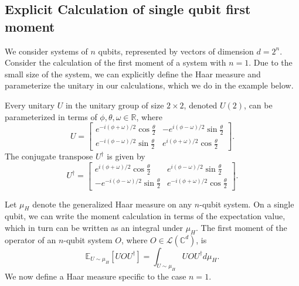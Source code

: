 \subsection{Explicit Calculation of single qubit first moment}
We consider systems of $n$ qubits, represented by vectors of dimension $d = 2^n$.
Consider the calculation of the first moment of a system with $n = 1$.
Due to the small size of the system, we can explicitly define the Haar measure and parameterize the unitary in our calculations, which we do in the example below.

\begin{remark}\label{rm:2x2_unitary_explicit_construction}
    Every unitary $U$ in the unitary group of size $2 \times 2$, denoted $U(2)$, can be parameterized in terms of $\phi, \theta, \omega \in \mathbb{R}$, where
    \begin{equation}
        U = \begin{bmatrix}
            e^{-i (\phi + \omega) / 2} \cos{\frac{\theta}{2}} & -e^{i (\phi - \omega) / 2} \sin{\frac{\theta}{2}}\\
            e^{-i (\phi - \omega) / 2} \sin{\frac{\theta}{2}} & e^{i (\phi + \omega) / 2} \cos{\frac{\theta}{2}}
        \end{bmatrix}.
    \end{equation}
    The conjugate transpose $U^{\dagger}$ is given by
    \begin{equation}
        U^{\dagger} = \begin{bmatrix}
        e^{i( \phi + \omega) / 2} \cos{\frac{\theta}{2}} & e^{i (\phi - \omega) / 2} \sin{\frac{\theta}{2}}\\
        - e^{-i (\phi - \omega) / 2} \sin{\frac{\theta}{2}} & e^{-i(\phi + \omega)/ 2} \cos{\frac{\theta}{2}}
        \end{bmatrix}.
    \end{equation}
\end{remark}

Let $\mu_{H}$ denote the generalized Haar measure on any $n$-qubit system.
On a single qubit, we can write the moment calculation in terms of the expectation value, which in turn can be written as an integral under $\mu_{H}$.
The first moment of the operator of an $n$-qubit system $O$, where $O \in \mathcal{L}(\mathbb{C}^{d})$, is
\begin{equation}
    \mathbb{E}_{U \sim \mu_{H}} [U O U^{\dagger}] = \int_{U \sim \mu_{H}} U O U^{\dagger} d\mu_{H}.
\end{equation}
We now define a Haar measure specific to the case $n = 1$.

